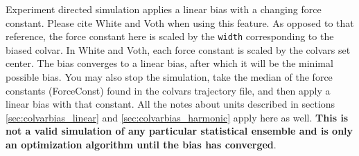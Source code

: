 \label{sec:colvarbias_alb}

Experiment directed simulation applies a linear bias with a changing
force constant. Please cite White and Voth \cite{White2014} when
using this feature. As opposed to that reference, the force constant here is scaled
by the \texttt{width} corresponding to the biased colvar. In White and
Voth, each force constant is scaled by the colvars set center. The
bias converges to a linear bias, after which it will be the minimal
possible bias. You may also stop the simulation, take the median of
the force constants (ForceConst) found in the colvars trajectory file,
and then apply a linear bias with that constant. All the notes about
units described in sections \ref{sec:colvarbias_linear}
and \ref{sec:colvarbias_harmonic} apply here as well. {\bf This is not
a valid simulation of any particular statistical ensemble and is only
an optimization algorithm until the bias has converged}.

